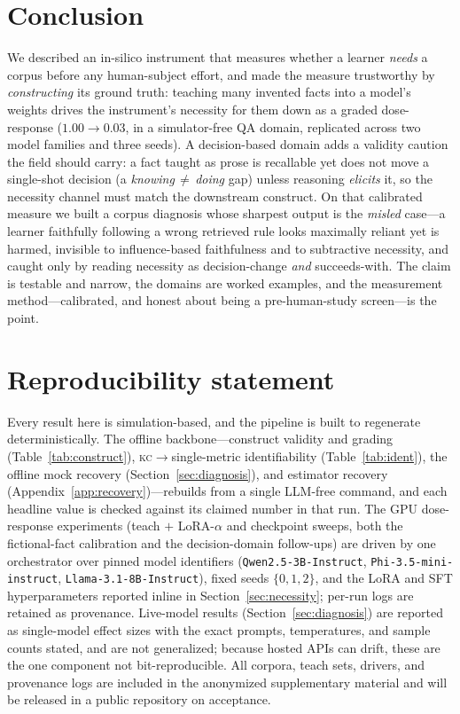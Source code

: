 \documentclass{article}
\newcommand{\kc}{\textsc{kc}}
\begin{document}
\section{Conclusion}
\label{sec:conclusion}
We described an in-silico instrument that measures whether a learner \emph{needs} a corpus before any
human-subject effort, and made the measure trustworthy by \emph{constructing} its ground truth:
teaching many invented facts into a model's weights drives the instrument's necessity for them down as
a graded dose-response ($1.00\!\to\!0.03$, in a simulator-free QA domain, replicated across two model
families and three seeds). A decision-based domain adds a validity caution the field should carry:
a fact taught as prose is recallable yet does not move a single-shot decision (a
\emph{knowing\,$\neq$\,doing} gap) unless reasoning \emph{elicits} it, so the necessity channel must
match the downstream construct. On that calibrated measure we built a corpus diagnosis whose sharpest
output is the \emph{misled} case---a learner faithfully following a wrong retrieved rule looks maximally
reliant yet is harmed, invisible to influence-based faithfulness and to subtractive necessity, and
caught only by reading necessity as decision-change \emph{and} succeeds-with. The claim is testable and
narrow, the domains are worked examples, and the measurement method---calibrated, and honest about
being a pre-human-study screen---is the point.

\section*{Reproducibility statement}
Every result here is simulation-based, and the pipeline is built to regenerate deterministically. The
offline backbone---construct validity and grading (Table~\ref{tab:construct}),
\kc$\to$single-metric identifiability (Table~\ref{tab:ident}), the offline mock recovery
(Section~\ref{sec:diagnosis}), and estimator recovery (Appendix~\ref{app:recovery})---rebuilds from a
single LLM-free command, and each headline value is checked against its claimed number in that run. The
GPU dose-response experiments (teach $+$ LoRA-$\alpha$ and checkpoint sweeps, both the fictional-fact
calibration and the decision-domain follow-ups) are driven by one orchestrator over pinned model
identifiers (\texttt{Qwen2.5-3B-Instruct}, \texttt{Phi-3.5-mini-instruct},
\texttt{Llama-3.1-8B-Instruct}), fixed seeds $\{0,1,2\}$, and the LoRA and SFT hyperparameters reported
inline in Section~\ref{sec:necessity}; per-run logs are retained as provenance. Live-model results
(Section~\ref{sec:diagnosis}) are reported as single-model effect sizes with the exact prompts,
temperatures, and sample counts stated, and are not generalized; because hosted APIs can drift, these
are the one component not bit-reproducible. All corpora, teach sets, drivers, and provenance logs are
included in the anonymized supplementary material and will be released in a public repository on
acceptance.
\end{document}
